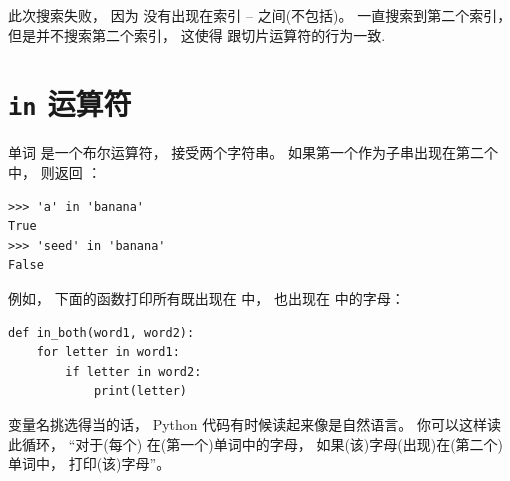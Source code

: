 %

此次搜索失败， 因为  没有出现在索引 -- 之间(不包括)。  一直搜索到第二个索引， 但是并不搜索第二个索引， 这使得  跟切片运算符的行为一致.

\section{{\tt in} 运算符}
\label{inboth}
  
  


单词  是一个布尔运算符， 接受两个字符串。  如果第一个作为子串出现在第二个中， 则返回 ：

\begin{lstlisting}
>>> 'a' in 'banana'
True
>>> 'seed' in 'banana'
False
\end{lstlisting}

%

例如， 下面的函数打印所有既出现在  中， 也出现在  中的字母：

\begin{lstlisting}
def in_both(word1, word2):
    for letter in word1:
        if letter in word2:
            print(letter)
\end{lstlisting}

%

变量名挑选得当的话， Python 代码有时候读起来像是自然语言。  你可以这样读此循环， ``对于(每个) 在(第一个)单词中的字母， 如果(该)字母(出现)在(第二个)单词中， 打印(该)字母''。

